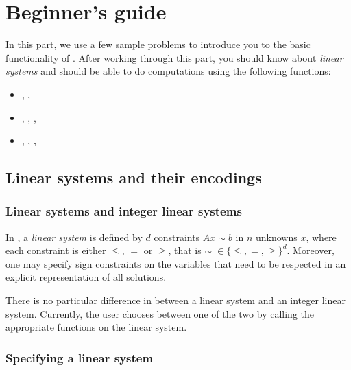 %
%
%

\chapter{Beginner's guide}

In this part, we use a few sample problems to introduce
you to the basic functionality of \FourTiTwo{}. After working
through this part, you should know about \emph{linear systems} and
should be able to do computations using the following functions:
\begin{itemize}
\item {}, , 
\item {}, , , 
\item {}, , , 
\end{itemize}



\section{Linear systems and their encodings}

\subsection{Linear systems and integer linear systems}

In \FourTiTwo, a \emph{linear system} is defined by $d$ constraints
$Ax\sim b$ in $n$ unknowns $x$, where each constraint is either
$\leq$, $=$ or $\geq$, that is $\sim\;\in\{\leq,=,\geq\}^d$.
Moreover, one may specify sign constraints on the variables that
need to be respected in an explicit representation of all solutions.

There is no particular difference in \FourTiTwo{} between a linear
system and an integer linear system. Currently, the user chooses
between one of the two by calling the appropriate functions on the
linear system.

\subsection{Specifying a linear system}

